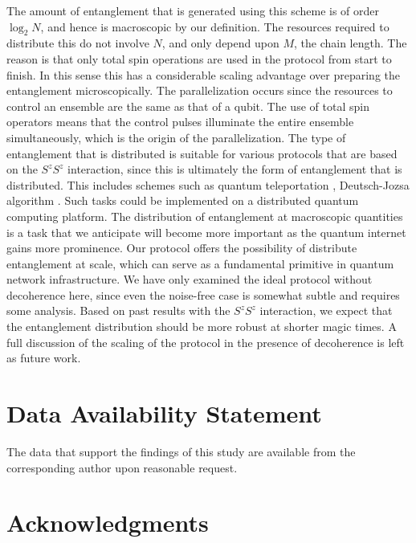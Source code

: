 \documentclass[%
  prx,%
  twocolumn,%
  preprintnumbers,%
  amsmath,%
  amssymb,%
  superscriptaddress%
]{revtex4}
\begin{document}
{The amount of entanglement that is generated using this scheme is of order $ \log_2 N$, and hence is macroscopic by our definition.   The resources required to distribute this do not involve $ N $, and only depend upon $ M $, the chain length.  The reason is that only total spin operations are used in the protocol from start to finish. In this sense this has a considerable scaling advantage over preparing the entanglement microscopically.  The parallelization occurs since the resources to control an ensemble are the same as that of a qubit. The use of total spin operators means that the control pulses illuminate the entire ensemble simultaneously, which is the origin of the parallelization.  The type of entanglement that is distributed is suitable for various protocols that are based on the $ S^z S^z $ interaction, since this is ultimately the form of entanglement that is distributed.  This includes schemes such as quantum teleportation \cite{pyrkov2014quantum,pyrkov2014full}, Deutsch-Jozsa algorithm \cite{semenenko2016implementing}. Such tasks could be implemented on a distributed quantum computing platform.  The distribution of entanglement at macroscopic quantities is a task that we anticipate will become more important as the quantum internet gains more prominence.  Our protocol offers the possibility of distribute entanglement at scale, which can serve as a fundamental primitive in quantum network infrastructure.  We have only examined the ideal protocol without decoherence here, since even the noise-free case is somewhat subtle and requires some analysis.  Based on past results with the $ S^z S^z $ interaction, we expect that the entanglement distribution should be more robust at shorter magic times.  A full discussion of the scaling of the protocol in the presence of decoherence is left as future work.










\section{Data Availability Statement}

The data that support the findings of this study are available from the corresponding author upon reasonable request.


\section{Acknowledgments}

}
\end{document}
